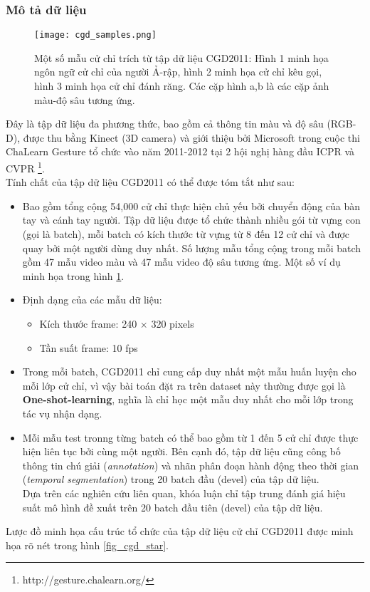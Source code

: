 \subsubsection{Mô tả dữ liệu}
\begin{figure}
\centering
\texttt{[image: cgd\_samples.png]}
\caption{Một số mẫu cử chỉ trích từ tập dữ liệu CGD2011: Hình 1 minh họa ngôn ngữ cử chỉ của người Ả-rập, hình 2 minh họa cử chỉ kêu gọi, hình 3 minh họa cử chỉ đánh răng. Các cặp hình a,b là các cặp ảnh màu-độ sâu tương ứng.}
\label{fig_cgd_samples}
\end{figure}
Đây là tập dữ liệu đa phương thức, bao gồm cả thông tin màu và độ sâu (RGB-D), được thu bằng Kinect (3D camera) và giới thiệu bởi Microsoft trong cuộc thi ChaLearn Gesture tổ chức vào năm 2011-2012 tại 2 hội nghị hàng đầu ICPR và CVPR \footnote{http://gesture.chalearn.org/}. \\
Tính chất của tập dữ liệu CGD2011 có thể được tóm tắt như sau: 
\begin{itemize}
\item Bao gồm tổng cộng 54,000 cử chỉ thực hiện chủ yếu bởi chuyển động của bàn tay và cánh tay người. Tập dữ liệu được tổ chức thành nhiều gói từ vựng con (gọi là batch), mỗi batch có kích thước từ vựng từ 8 đến 12 cử chỉ và được quay bởi một người dùng duy nhất. Số lượng mẫu tổng cộng trong mỗi batch gồm 47 mẫu video màu và 47 mẫu video độ sâu tương ứng. Một số ví dụ minh họa trong hình \ref{fig_cgd_samples}.
\item Định dạng của các mẫu dữ liệu:
	\begin{itemize}
		\item Kích thước frame: 240 \(\times\) 320 pixels
		\item Tần suất frame: 10 fps
	\end{itemize}
\item Trong mỗi batch, CGD2011 chỉ cung cấp duy nhất một mẫu huấn luyện cho mỗi lớp cử chỉ, vì vậy bài toán đặt ra trên dataset này thường được gọi là \textbf{One-shot-learning}, nghĩa là chỉ học một mẫu duy nhất cho mỗi lớp trong tác vụ nhận dạng.
\item Mỗi mẫu test tronng từng batch có thể bao gồm từ 1 đến 5 cử chỉ được thực hiện liên tục bởi cùng một người. Bên cạnh đó, tập dữ liệu cũng công bố thông tin chú giải (\textit{annotation}) và nhãn phân đoạn hành động theo thời gian (\textit{temporal segmentation}) trong 20 batch đầu (devel) của tập dữ liệu. \\
Dựa trên các nghiên cứu liên quan, khóa luận chỉ tập trung đánh giá hiệu suất mô hình đề xuất trên 20 batch đầu tiên (devel) của tập dữ liệu.
\end{itemize} 
Lược đồ minh họa cấu trúc tổ chức của tập dữ liệu cử chỉ CGD2011 được minh họa rõ nét trong hình \ref{fig_cgd_star}.


